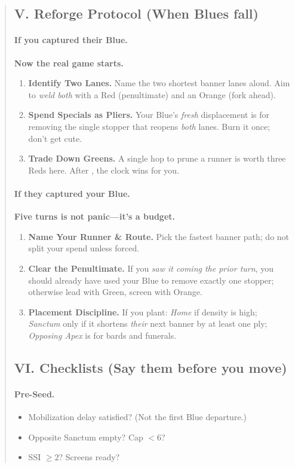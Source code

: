 \documentclass[11pt]{article}
\newcommand{\CapC}[1]{\textcolor{green!40!black}{\scriptsize\ttfamily[G:#1]}}
\begin{document}
\begin{quote}
\subsection{V. Reforge Protocol (When Blues fall)}
\paragraph{If you captured their Blue.} \textbf{Now the real game starts.}
\begin{enumerate}\itemsep0.25em
  \item \textbf{Identify Two Lanes.} Name the two shortest banner lanes aloud. Aim to \emph{weld both} with a Red (penultimate) and an Orange (fork ahead).
  \item \textbf{Spend Specials as Pliers.} Your Blue’s \emph{fresh} displacement is for removing the single stopper that reopens \emph{both} lanes. Burn it once; don’t get cute.
  \item \textbf{Trade Down Greens.} A single hop to prune a runner is worth three Reds here. After \CapC{2--0}, the clock wins for you.
\end{enumerate}
\paragraph{If they captured your Blue.} \textbf{Five turns is not panic—it's a budget.}
\begin{enumerate}\itemsep0.25em
  \item \textbf{Name Your Runner \& Route.} Pick the fastest banner path; do not split your spend unless forced.
  \item \textbf{Clear the Penultimate.} If you \emph{saw it coming the prior turn}, you should already have used your Blue to remove exactly one stopper; otherwise lead with Green, screen with Orange.
  \item \textbf{Placement Discipline.} If you plant: \emph{Home} if density is high; \emph{Sanctum} only if it shortens \emph{their} next banner by at least one ply; \emph{Opposing Apex} is for bards and funerals.
\end{enumerate}

\subsection{VI. Checklists (Say them before you move)}
\paragraph{Pre-Seed.}
\begin{itemize}\itemsep0.15em
  \item Mobilization delay satisfied? (Not the first Blue departure.)
  \item Opposite Sanctum empty? Cap $<6$?
  \item SSI $\ge 2$? Screens ready?
\end{itemize}

\end{quote}
\end{document}
